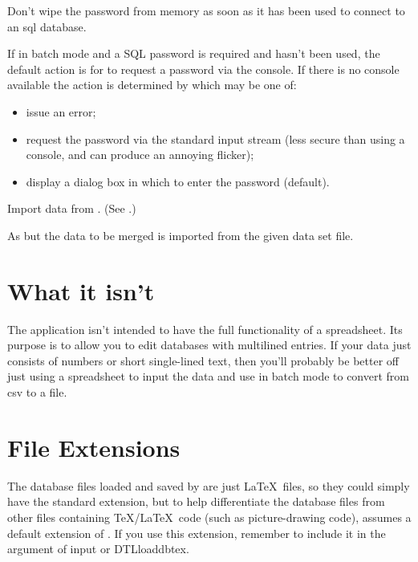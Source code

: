 Don't wipe the password from memory as soon as it 
has been used to connect to an \gls{sql} database.

If in batch mode and a SQL password is required
and  hasn't been used, the
default action is for  to request a password
via the console. If there is no console available
the action is determined by 
which may be one of:
\begin{itemize}
  \item {} issue an error;
  \item {} request the password via the standard
  input stream (less secure than using a console, and can produce 
  an annoying flicker);
  \item {} display a dialog box in which to enter the password (default).
\end{itemize}

Import  data from .
(See .)

As  but the data to be merged is imported from the
given  data set file.

\section{What it isn't}
\label{notaspreadsheet}

The  application isn't intended to have the full functionality of
a spreadsheet. Its purpose is to allow you to edit 
 databases with multilined entries. If your data 
just consists of numbers or short single-lined text, then you'll probably 
be better off just using a spreadsheet to input the data and 
use  in batch mode to convert from \gls{csv} to 
a  file.

\section{File Extensions}
\label{fileext}

The  database files loaded and saved by 
are just \LaTeX\ files, so they could simply have the standard
 extension, but to help differentiate the database files
from other files containing \TeX\slash \LaTeX\ code (such as picture-drawing
code),  assumes a default extension of .
If you use this extension, remember to include it in the argument of
\gls{input} or \gls{DTLloaddbtex}.

